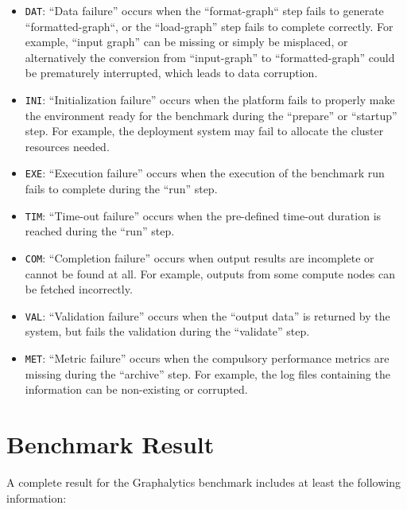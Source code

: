 \begin{itemize}
    \item \texttt{DAT}: ``Data failure'' occurs when the ``format-graph`` step fails to generate ``formatted-graph``, or the ``load-graph'' step fails to complete correctly. For example, ``input graph'' can be missing or simply be misplaced, or alternatively the conversion from ``input-graph'' to ``formatted-graph'' could be prematurely interrupted, which leads to data corruption.
    
    \item \texttt{INI}: ``Initialization failure'' occurs when the platform fails to properly make the environment ready for the benchmark during the ``prepare'' or ``startup'' step. For example, the deployment system may fail to allocate the cluster resources needed.
    
    \item \texttt{EXE}: ``Execution failure'' occurs when the execution of the benchmark run fails to complete during the ``run'' step.
    
    \item \texttt{TIM}: ``Time-out failure'' occurs when the pre-defined time-out duration is reached during the ``run'' step.

    \item \texttt{COM}: ``Completion failure'' occurs when output results are incomplete or cannot be found at all. For example, outputs from some compute nodes can be fetched incorrectly.
    
    \item \texttt{VAL}: ``Validation failure'' occurs when the ``output data'' is returned by the system, but fails the validation during the ``validate'' step.
    
    \item \texttt{MET}: ``Metric failure'' occurs when the compulsory performance metrics are missing during the ``archive'' step. For example, the log files containing the information can be non-existing or corrupted.
\end{itemize}










\section{Benchmark Result}

A complete result for the Graphalytics benchmark includes at least the following information: 


